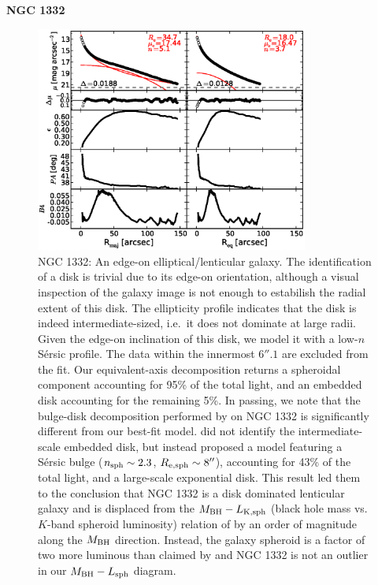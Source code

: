 \documentclass[preprint2]{emulateapj}
\newcommand{\fitfigurewidth}{0.8\textwidth}
\begin{document}
  \clearpage\newpage\noindent
  {\bf NGC 1332 \\}

  \begin{figure}[h]
  \begin{center}
  \includegraphics[width=\fitfigurewidth]{n1332_1Dfit.eps}
  \caption{NGC 1332: 
  An edge-on elliptical/lenticular galaxy. 
  The identification of a disk is trivial due to its edge-on orientation, 
  although a visual inspection of the galaxy image is not enough to estabilish the radial extent of this disk. 
  The ellipticity profile indicates that the disk is indeed intermediate-sized, i.e.~it does not dominate at large radii. 
  Given the edge-on inclination of this disk, we model it with a low-$n$ S\'ersic profile. 
  The data within the innermost $6''.1$ are excluded from the fit.
  Our equivalent-axis decomposition returns a spheroidal component accounting for 95\% of the total light,
  and an embedded disk accounting for the remaining 5\%.
  In passing, we note that the bulge-disk decomposition performed by \citet{rusli2011} on NGC 1332 
  is significantly different from our best-fit model.
  \citet{rusli2011} did not identify the intermediate-scale embedded disk, 
  but instead proposed a model featuring a S\'ersic bulge ($n_{\rm sph} \sim 2.3$, $R_{\rm e,sph} \sim 8''$), accounting for 43\% of the total light, 
  and a large-scale exponential disk. 
  This result led them to the conclusion that NGC 1332 is a disk dominated lenticular galaxy 
  and is displaced from the $M_{\rm BH} - L_{\rm K,sph}$ (black hole mass vs. $K$-band spheroid luminosity) relation of \citet{marconihunt2003} 
  by an order of magnitude along the $M_{\rm BH}$ direction.
  Instead, the galaxy spheroid is a factor of two more luminous than claimed by \citet{rusli2011} and  
  NGC 1332 is not an outlier in our $M_{\rm BH} - L_{\rm sph}$ diagram. \\
  }
  \end{center}
  \end{figure}
\end{document}
